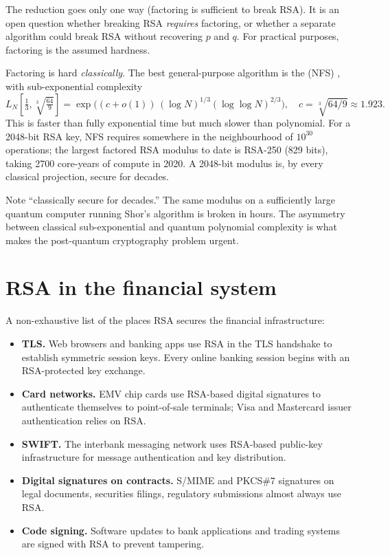 The reduction goes only one way (factoring is sufficient to break RSA). It is an open question whether breaking RSA \emph{requires} factoring, or whether a separate algorithm could break RSA without recovering $p$ and $q$. For practical purposes, factoring is the assumed hardness.

Factoring is hard \emph{classically}. The best general-purpose algorithm is the  (NFS) \citep{lenstra_factoring_1993}, with sub-exponential complexity
\[
  L_N\!\left[\tfrac{1}{3}, \sqrt[3]{\tfrac{64}{9}}\right] = \exp\!\Big((c+o(1))\,(\log N)^{1/3}(\log\log N)^{2/3}\Big), \quad c=\sqrt[3]{64/9}\approx 1.923.
\]
This is faster than fully exponential time but much slower than polynomial. For a 2048-bit RSA key, NFS requires somewhere in the neighbourhood of $10^{30}$ operations; the largest factored RSA modulus to date is RSA-250 (829 bits), taking 2700 core-years of compute in 2020. A 2048-bit modulus is, by every classical projection, secure for decades.

\begin{remark}
Note ``classically secure for decades.'' The same modulus on a sufficiently large quantum computer running Shor's algorithm is broken in hours. The asymmetry between classical sub-exponential and quantum polynomial complexity is what makes the post-quantum cryptography problem urgent.
\end{remark}

\section{RSA in the financial system}

A non-exhaustive list of the places RSA secures the financial infrastructure:

\begin{itemize}
  \item \textbf{TLS.} Web browsers and banking apps use RSA in the TLS handshake to establish symmetric session keys. Every online banking session begins with an RSA-protected key exchange.
  \item \textbf{Card networks.} EMV chip cards use RSA-based digital signatures to authenticate themselves to point-of-sale terminals; Visa and Mastercard issuer authentication relies on RSA.
  \item \textbf{SWIFT.} The interbank messaging network uses RSA-based public-key infrastructure for message authentication and key distribution.
  \item \textbf{Digital signatures on contracts.} S/MIME and PKCS\#7 signatures on legal documents, securities filings, regulatory submissions almost always use RSA.
  \item \textbf{Code signing.} Software updates to bank applications and trading systems are signed with RSA to prevent tampering.
\end{itemize}

